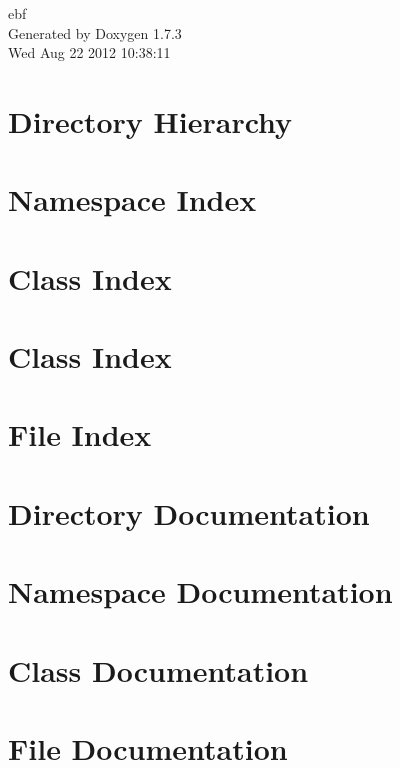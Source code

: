 \documentclass[letterpaper]{book}
\begin{document}
\hypersetup{pageanchor=false}
\begin{titlepage}
\vspace*{7cm}
\begin{center}
{\Large ebf }\\
\vspace*{1cm}
{\large Generated by Doxygen 1.7.3}\\
\vspace*{0.5cm}
{\small Wed Aug 22 2012 10:38:11}\\
\end{center}
\end{titlepage}
\clearemptydoublepage
{}
\tableofcontents
\clearemptydoublepage
{}
\hypersetup{pageanchor=true}
\chapter{Directory Hierarchy}

\chapter{Namespace Index}

\chapter{Class Index}

\chapter{Class Index}

\chapter{File Index}

\chapter{Directory Documentation}

\chapter{Namespace Documentation}













\chapter{Class Documentation}





\chapter{File Documentation}












\printindex
\end{document}

